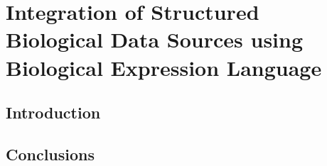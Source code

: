 
\chapter{Integration of Structured Biological Data Sources using Biological Expression Language}\label{chap:bio2bel}

\section*{Introduction}

\vspace*{\fill}



\section*{Conclusions}

